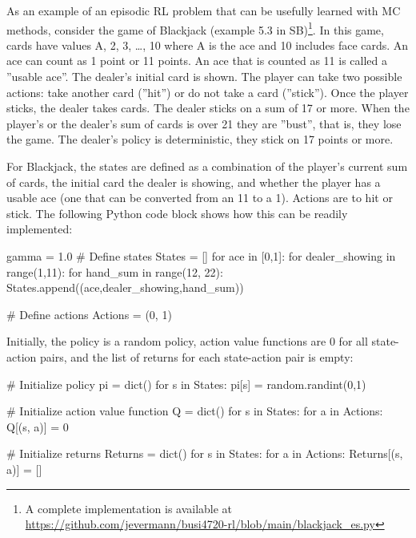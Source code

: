 As an example of an episodic RL problem that can be usefully learned with MC methods, consider the game of Blackjack (example 5.3 in SB)\footnote{A complete implementation is available at \url{https://github.com/jevermann/busi4720-rl/blob/main/blackjack_es.py}}. In this game,
cards have values A, 2, 3, \ldots, 10 where A is the ace and 10 includes face cards. An ace can count as 1 point or 11 points. An ace that is counted as 11 is called a ''usable ace''. The dealer's initial card is shown. The player can take two possible actions: take another card (''hit'') or do not take a card (''stick''). Once the player sticks, the dealer takes cards. The dealer sticks on a sum of 17 or more. When the player's or the dealer's sum of cards is over 21 they are ''bust'', that is, they lose the game. The dealer's policy is deterministic, they stick on 17 points or more. 

For Blackjack, the states are defined as a combination of the player's current sum of cards, the initial card the dealer is showing, and whether the player has a usable ace (one that can be converted from an 11 to a 1). Actions are to hit or stick. The following Python code block shows how this can be readily implemented:

\begin{samepage}
\begin{pythoncode}
gamma = 1.0
# Define states
States = []
for ace in [0,1]:
    for dealer_showing in range(1,11):
        for hand_sum in range(12, 22):
            States.append((ace,dealer_showing,hand_sum))

# Define actions
Actions = (0, 1)
\end{pythoncode}
\end{samepage}

Initially, the policy is a random policy, action value functions are 0 for all state-action pairs, and the list of returns for each state-action pair is empty:

\begin{samepage}
\begin{pythoncode}
# Initialize policy
pi = dict()
for s in States:
    pi[s] = random.randint(0,1)

# Initialize action value function
Q = dict()
for s in States:
    for a in Actions:
        Q[(s, a)] = 0

# Initialize returns
Returns = dict()
for s in States:
    for a in Actions:
        Returns[(s, a)] = []
\end{pythoncode}
\end{samepage}


